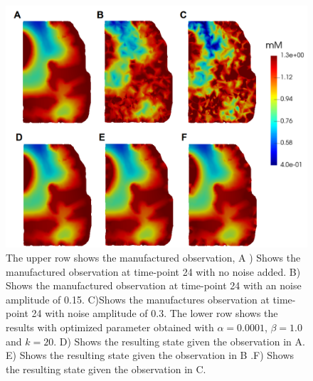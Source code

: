 \documentclass[12pt,a4paper]{article}
\begin{document}
\begin{figure}
\centering
\includegraphics[scale=0.4]{noise-12.png}  
\caption{The upper row shows the manufactured observation, A ) Shows the manufactured observation at time-point 24 with no noise added. B) Shows the manufactured observation at time-point 24 with an noise amplitude of 0.15. C)Shows the manufactures observation at time-point 24 with noise amplitude of 0.3. The lower row shows the results with optimized parameter obtained with $\alpha=0.0001$, $\beta=1.0$ and $k=20$. D) Shows the resulting state given the observation in A. E)  Shows the resulting state given the observation in B .F) Shows the resulting state given the observation in C. }
\label{12hourswithnoise}
\end{figure}
\end{document}

